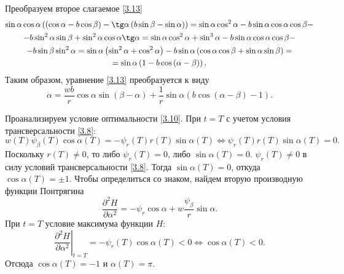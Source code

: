 \documentclass[a4paper,12pt, openany]{book}
\theoremstyle{plain} %
\theoremstyle{definition} %
\theoremstyle{remark} %
\numberwithin{equation}{chapter}
\begin{document}
{Преобразуем второе слагаемое \eqref{3.13}
\begin{multline*}
\sin \alpha \cos \alpha \left( {\left( {\cos \alpha  - b\cos \beta } \right) - \tg\alpha \left( {b\sin \beta  - \sin \alpha } \right)} \right) = \sin \alpha \cos ^2 \alpha  - b\sin \alpha \cos \alpha \cos \beta  - \\
 - b\sin ^2 \alpha \sin \beta  + \sin ^2 \alpha \cos \alpha \tg\alpha  = \sin \alpha \cos ^2 \alpha  + \sin ^3 \alpha  - b\sin \alpha \cos \alpha \cos \beta  - \\
 - b\sin \beta \sin ^2 \alpha  = \sin \alpha \left( {\sin ^2 \alpha  + \cos ^2 \alpha } \right) - b\sin \alpha \left( {\cos \alpha \cos \beta  + \sin \alpha \sin \beta } \right) = \\ 
 = \sin \alpha \left( {1 - b\cos \left( {\alpha  - \beta } \right)} \right).
\end{multline*}
Таким образом, уравнение \eqref{3.13} преобразуется к виду
\begin{equation}\label{3.14}
\dot \alpha  = \frac{{wb}}{r}\cos \alpha \sin \left( {\beta  - \alpha } \right) + \frac{1}{r}\sin \alpha \left( {b\cos \left( {\alpha  - \beta } \right) - 1} \right).
\end{equation}

Проанализируем условие оптимальности \eqref{3.10}. При $t=T$ с учетом условия трансверсальности \eqref{3.8}:
\[
w\left( T \right)\psi _\beta  \left( T \right)\cos \alpha \left( T \right) =  - \psi _r \left( T \right)r\left( T \right)\sin \alpha \left( T \right) \Longleftrightarrow \psi _r \left( T \right)r\left( T \right)\sin \alpha \left( T \right) = 0.
\]
Поскольку $r(T) \neq 0$, то либо $\psi_r(T) = 0$, либо $\sin\alpha(T) = 0$. $\psi_r(T) \neq 0$ в силу условий трансверсальности \eqref{3.8}.
 Тогда $\sin\alpha(T) = 0$, откуда $\cos\alpha(T) = \pm 1$. Чтобы определиться со знаком, найдем вторую производную функции Понтрягина
\[
\frac{{\partial ^2 H}}{{\partial \alpha ^2 }} =  - \psi _r \cos \alpha  + w\frac{{\psi _\beta  }}{r}\sin \alpha .
\]
При $t=T$ условие максимума функции $H$:
\[
\left. {\frac{{\partial ^2 H}}{{\partial \alpha ^2 }}} \right|_{t = T}  =  - \psi _r \left( T \right)\cos \alpha \left( T \right) < 0 \Longleftrightarrow \cos \alpha \left( T \right) < 0.
\]
Отсюда $\cos\alpha(T) = -1$ и $\alpha(T) = \pi$.

}
\end{document}
